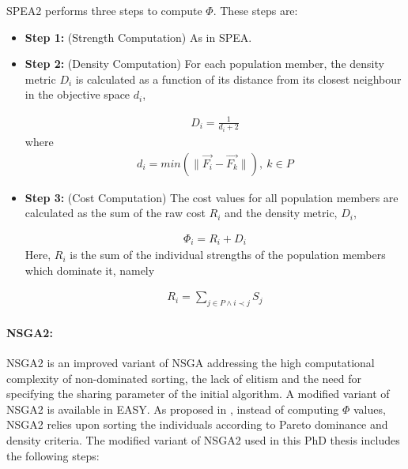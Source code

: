 SPEA2 performs three steps to compute $\Phi$. These steps are:

\begin{itemize}
\item[]{\bf Step 1:}  (Strength Computation) As in SPEA.

\item[]{\bf Step 2:}  (Density Computation) For each population member, the density metric $D_i$ is calculated  as a function of its distance from its closest neighbour in the objective space $d_i$,

\begin{eqnarray}
	D_i = \frac{1} {d_i+2} 
\end{eqnarray}
where
\begin{eqnarray}
	\nonumber
	d_i= min (\parallel \vec{F_i} - \vec{F_k} \parallel), ~ k \in P  
\end{eqnarray}


\item[]{\bf Step 3:}  (Cost Computation) The cost values for all population members are calculated as the sum of the raw cost $R_i$ and the density metric, $D_i$,

\begin{eqnarray}
	\Phi_i = R_i+D_i
\label{SPEAIIeq}
\end{eqnarray}
Here, $R_i$ is the sum of the individual strengths of the population members which dominate it, namely
  
\begin{eqnarray}
	\nonumber
	R_i=\sum _{j \in P \wedge i \prec j}S_j 
\end{eqnarray}  
\end{itemize}

\paragraph{NSGA2:} 
NSGA2 \cite{Deb00a} is an improved variant of NSGA \cite{Sri1995} addressing the high computational complexity of non-dominated sorting, the lack of elitism and the need for specifying the sharing parameter of the initial algorithm. A modified variant of NSGA2 is available in EASY. As proposed in \cite{Deb00a}, instead of computing $\Phi$ values, NSGA2 relies upon sorting the individuals according to Pareto dominance and density criteria. The modified variant of NSGA2 used in this PhD thesis includes the following steps:    


